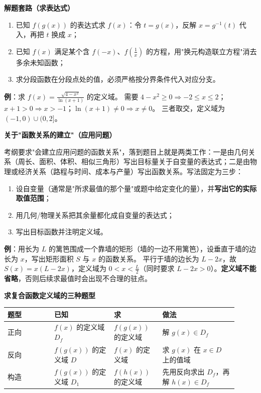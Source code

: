 \documentclass[11pt,openany,UTF8]{ctexbook}
\begin{document}
\textbf{解题套路（求表达式）}

\begin{enumerate}
\item 已知 $f(g(x))$ 的表达式求 $f(x)$：令 $t=g(x)$，反解 $x=g^{-1}(t)$ 代入，再把 $t$ 换成 $x$；
\item 已知 $f(x)$ 满足某个含 $f(-x)$、$f(\frac1x)$ 的方程，用"换元构造联立方程"消去多余未知函数；
\item 求分段函数在分段点处的值，必须严格按分界条件代入对应分支。
\end{enumerate}
\textbf{例}：求 $f(x)=\frac{\sqrt{4-x^2}}{\ln(x+1)}$ 的定义域。 需要 $4-x^2\ge 0\Rightarrow -2\le x\le 2$；$x+1>0\Rightarrow x>-1$；$\ln(x+1)\ne 0\Rightarrow x\ne 0$。 三者取交，定义域为 $(-1,0)\cup(0,2]$。

\textbf{关于"函数关系的建立"（应用问题）}

考纲要求"会建立应用问题的函数关系"，落到题目上就是两类工作：一是由几何关系（周长、面积、体积、相似三角形）写出目标量关于自变量的表达式；二是由物理或经济关系（路程与时间、成本与产量）写出函数关系。写法固定为三步：

\begin{enumerate}
\item 设自变量（通常是"所求最值的那个量"或题中给定变化的量），并\textbf{写出它的实际取值范围}；
\item 用几何/物理关系把其余量都化成自变量的表达式；
\item 写出目标函数并注明定义域。
\end{enumerate}
\textbf{例}：用长为 $L$ 的篱笆围成一个靠墙的矩形（墙的一边不用篱笆），设垂直于墙的边长为 $x$，写出矩形面积 $S$ 与 $x$ 的函数关系。 平行于墙的边长为 $L-2x$，故 $S(x)=x(L-2x)$，定义域为 $0<x<\frac L2$（同时要求 $L-2x>0$）。\textbf{定义域不能省略}，否则后续求最值时会出现不合理的驻点。

\textbf{求复合函数定义域的三种题型}

\begingroup\small\setlength{\tabcolsep}{4.0pt}
\begin{longtable}{@{}L{0.1894\linewidth}L{0.2367\linewidth}L{0.1894\linewidth}L{0.2959\linewidth}@{}}
\toprule
\textbf{题型} & \textbf{已知} & \textbf{求} & \textbf{做法} \\
\midrule
\endhead
正向 & $f(x)$ 的定义域 $D_f$ & $f(g(x))$ 的定义域 & 解 $g(x)\in D_f$ \\
反向 & $f(g(x))$ 的定义域 $D$ & $f(x)$ 的定义域 & 求 $g(x)$ 在 $x\in D$ 上的值域 \\
构造 & $f(g(x))$ 的定义域 $D_1$ & $f(h(x))$ 的定义域 & 先用反向求出 $D_f$，再解 $h(x)\in D_f$ \\
\bottomrule
\end{longtable}
\endgroup
\end{document}
